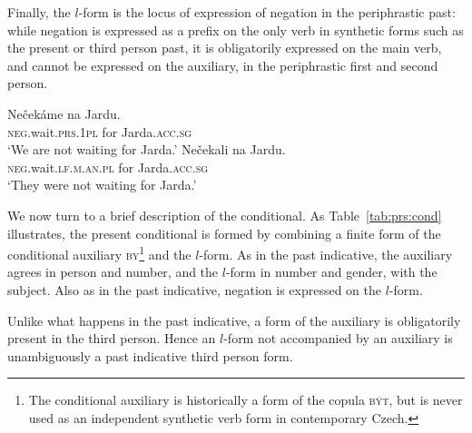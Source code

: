 \documentclass[output=paper]{langsci/langscibook}
\begin{document}
Finally, the $l$-form is the locus of expression of negation in the periphrastic past: while negation is expressed as a prefix on the only verb in synthetic forms such as the present or third person past, it is obligatorily expressed on the main verb, and cannot be expressed on the auxiliary, in the periphrastic first and second person.

\begin{exe}
\ex\label{ex:basic:prs:neg}\gll Nečekáme na Jardu.\\
\textsc{neg.}wait.\textsc{prs.1pl} for Jarda.\textsc{acc.sg}\\
\glt ‘We are not waiting for Jarda.’
\ex\gll Nečekali  na Jardu.\\ 
\textsc{neg.}wait.\textsc{lf.m.an.pl}  for Jarda.\textsc{acc.sg}\\
\glt ‘They were not waiting for Jarda.’
\ex\label{ex:basic:pst:neg}\begin{xlist}
\end{xlist}
\end{exe}


We now turn to a brief description of the conditional. As Table~\ref{tab:prs:cond} illustrates, the present conditional  is formed by combining a finite form of the conditional auxiliary \textsc{by}\footnote{The conditional auxiliary is historically a form of the copula \textsc{být}, but is never used as an independent synthetic verb form in contemporary Czech.} and the $l$-form. As in the past indicative, the auxiliary agrees in person and number, and the $l$-form in number and gender, with the subject. Also as in the past indicative, negation is expressed on the $l$-form.

\begin{exe}
\end{exe}

 Unlike what happens in the past indicative, a form of the auxiliary is obligatorily present in the third person. Hence an $l$-form not accompanied by an auxiliary is unambiguously a past indicative third person form. 
\end{document}
